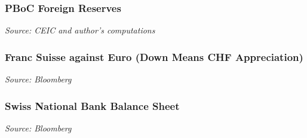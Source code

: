 \documentclass{beamer}
\begin{document}
\begin{frame}
\frametitle{PBoC Foreign Reserves}
\medskip
\emph{Source: CEIC and author's computations}
\end{frame}


\begin{frame}
\frametitle{Franc Suisse against Euro (Down Means CHF Appreciation)}
\medskip
\emph{Source: Bloomberg}
\end{frame}


\begin{frame}
\frametitle{Swiss National Bank Balance Sheet}
\medskip
\emph{Source: Bloomberg}
\end{frame}
\end{document}
